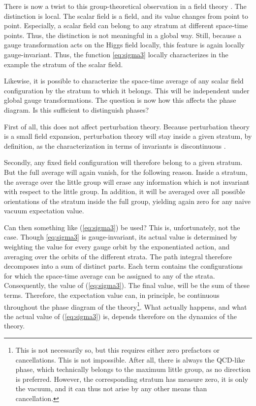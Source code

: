 \documentclass[final,12pt,3p,longtitle]{elsarticle}
\newcommand*{\pref}[1]{(\ref{#1})}
\newcommand*{\1}{1\!\!\!\bot}
\begin{document}
There is now a twist to this group-theoretical observation in a field theory \cite{Maas:2017xzh}. The distinction is local. The scalar field is a field, and its value changes from point to point. Especially, a scalar field can belong to any stratum at different space-time points. Thus, the distinction is not meaningful in a global way. Still, because a gauge transformation acts on the Higgs field locally, this feature is again locally gauge-invariant. Thus, the function \eqref{eq:sigma3} locally characterizes in the example the stratum of the scalar field.

Likewise, it is possible to characterize the space-time average of any scalar field configuration by the stratum to which it belongs. This will be independent under global gauge transformations. The question is now how this affects the phase diagram. Is this sufficient to distinguish phases?

First of all, this does not affect perturbation theory. Because perturbation theory is a small field expansion, perturbation theory will stay inside a given stratum, by definition, as the characterization in terms of invariants is discontinuous \cite{O'Raifeartaigh:1986vq}.

Secondly, any fixed field configuration will therefore belong to a given stratum. But the full average will again vanish, for the following reason. Inside a stratum, the average over the little group will erase any information which is not invariant with respect to the little group. In addition, it will be averaged over all possible orientations of the stratum inside the full group, yielding again zero for any naive vacuum expectation value. 

Can then something like \pref{eq:sigma3} be used? This is, unfortunately, not the case. Though \eqref{eq:sigma3} is gauge-invariant, its actual value is determined by weighting the value for every gauge orbit by the exponentiated action, and averaging over the orbits of the different strata. The path integral therefore decomposes into a sum of distinct parts. Each term contains the configurations for which the space-time average can be assigned to any of the strata. Consequently, the value of \pref{eq:sigma3}. The final value, will be the sum of these terms. Therefore, the expectation value can, in principle, be continuous throughout the phase diagram of the theory\footnote{This is not necessarily so, but this requires either zero prefactors or cancellations. This is not impossible. After all, there is always the QCD-like phase, which technically belongs to the maximum little group, as no direction is preferred. However, the corresponding stratum has measure zero, it is only the vacuum, and it can thus not arise by any other means than cancellation.}. What actually happens, and what the actual value of \pref{eq:sigma3} is, depends therefore on the dynamics of the theory.
\end{document}
